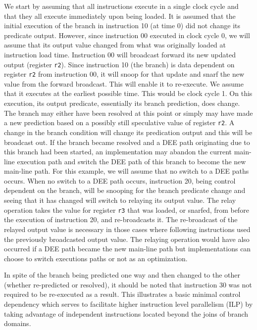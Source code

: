 We start by assuming that all instructions execute in a single clock
cycle and that they all execute immediately upon being loaded.
It is assumed that the initial execution of the branch in
instruction 10 (at time 0) did not change its predicate output.
However, since instruction 00 executed in clock cycle 0, we will
assume that its output value changed from what was originally loaded
at instruction load time.  Instruction 00 will broadcast forward
its new updated output (register
{\tt r2}).
Since instruction 10 (the branch) is data dependent on
register
{\tt r2}
from instruction 00, it will snoop for that update
and snarf the new value from the forward broadcast.  
This will enable it to re-execute.
We assume that it executes at the earliest possible time.
This would be clock cycle 1.  On this execution, its output predicate,
essentially its branch prediction, does change.  The branch may either
have been resolved at this point or simply may have made a new prediction
based on a possibly still speculative value of register
{\tt r2}.
A change in the branch condition will change its
predication output and this will be
broadcast out.
If the branch became resolved and a DEE path originating due to this
branch had been started, an implementation may abandon the
current main-line execution path and switch the DEE path of this branch
to become the new main-line path.
For this example, we will assume that
no switch to a DEE paths occurs.  When no switch to a DEE path occurs,
instruction 20, being control dependent on the branch, will be snooping
for the branch predicate change and seeing that it has changed
will switch to relaying its output value.  
The relay operation
takes the value for register
{\tt r3} that was loaded, or snarfed, from before the execution
of instruction 20, and re-broadcasts it.  The re-broadcast of the relayed 
output value is necessary in those cases where following instructions
used the previously broadcasted output value.
The relaying operation would have
also occurred
if a DEE path became the new main-line path
but implementations can choose to switch executions paths or
not as an optimization.

In spite of the branch being predicted one way and then changed
to the other (whether re-predicted or resolved), it should be
noted that instruction 30 was not required to be re-executed as
a result.  This illustrates a basic minimal control dependency
which serves to facilitate higher instruction level parallelism (ILP)
by taking advantage of independent instructions located beyond the
joins of branch domains.

